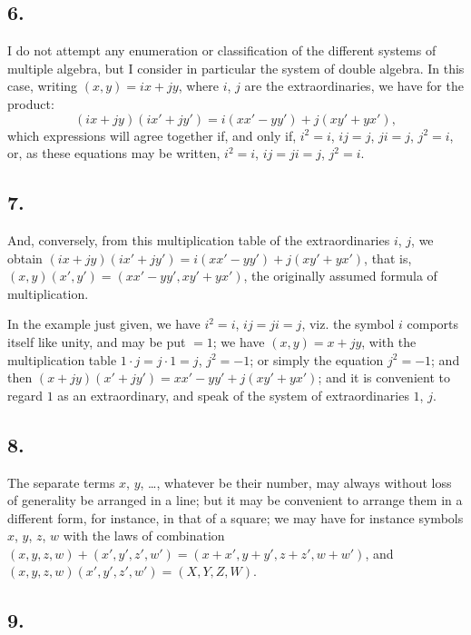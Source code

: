 \documentclass[11pt,a4paper]{book}
\begin{document}
\subsection*{6.}

I do not attempt any enumeration or classification of the different systems of multiple algebra, but I consider in particular the system of double algebra. In this case, writing $(x, y) = ix + jy$, where $i$, $j$ are the extraordinaries, we have for the product:
\[
(ix + jy)(ix' + jy') = i(xx' - yy') + j(xy' + yx'),
\]
which expressions will agree together if, and only if, $i^2 = i$, $ij = j$, $ji = j$, $j^2 = i$, or, as these equations may be written, $i^2 = i$, $ij = ji = j$, $j^2 = i$.

\subsection*{7.}

And, conversely, from this multiplication table of the extraordinaries $i$, $j$, we obtain $(ix + jy)(ix' + jy') = i(xx' - yy') + j(xy' + yx')$, that is, $(x, y)(x', y') = (xx' - yy', xy' + yx')$, the originally assumed formula of multiplication.

In the example just given, we have $i^2 = i$, $ij = ji = j$, viz. the symbol $i$ comports itself like unity, and may be put $= 1$; we have $(x, y) = x + jy$, with the multiplication table $1 \cdot j = j \cdot 1 = j$, $j^2 = -1$; or simply the equation $j^2 = -1$; and then $(x + jy)(x' + jy') = xx' - yy' + j(xy' + yx')$; and it is convenient to regard $1$ as an extraordinary, and speak of the system of extraordinaries $1$, $j$.

\subsection*{8.}

The separate terms $x$, $y$, \ldots, whatever be their number, may always without loss of generality be arranged in a line; but it may be convenient to arrange them in a different form, for instance, in that of a square; we may have for instance symbols $x$, $y$, $z$, $w$ with the laws of combination $(x, y, z, w) + (x', y', z', w') = (x + x', y + y', z + z', w + w')$, and $(x, y, z, w)(x', y', z', w') = (X, Y, Z, W)$.

\subsection*{9.}
\end{document}
